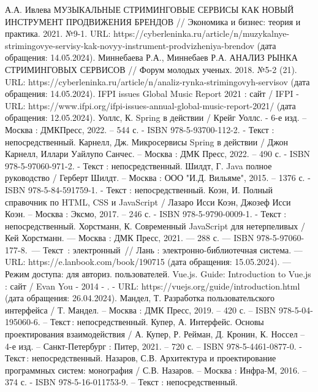 
\begin{thebibliography}{9}
     А.А. Ивлева МУЗЫКАЛЬНЫЕ СТРИМИНГОВЫЕ СЕРВИСЫ КАК НОВЫЙ ИНСТРУМЕНТ ПРОДВИЖЕНИЯ БРЕНДОВ // Экономика и бизнес: теория и практика. 2021. №9-1. URL: https://cyberleninka.ru/article/n/muzykalnye-strimingovye-servisy-kak-novyy-instrument-prodvizheniya-brendov (дата обращения: 14.05.2024).
	 Миннебаева Р.А., Миннебаев Р.А. АНАЛИЗ РЫНКА СТРИМИНГОВЫХ СЕРВИСОВ // Форум молодых ученых. 2018. №5-2 (21). URL: https://cyberleninka.ru/article/n/analiz-rynka-strimingovyh-servisov (дата обращения: 14.05.2024).
	 IFPI issues Global Music Report 2021 : сайт / IFPI - URL: https://www.ifpi.org/ifpi-issues-annual-global-music-report-2021/ (дата обращения: 12.05.2024).
      Уоллс, К. Spring в действии / Крейг Уоллс. - 6-е изд. – Москва : ДМКПресс, 2022. – 544 с. - ISBN 978-5-93700-112-2. - Текст : непосредственный.
     Карнелл, Дж. Микросервисы Spring в действии / Джон Карнелл, Иллари Уайлупо Санчес. – Москва : ДМК Пресс, 2022. – 490 с. - ISBN 978-5-97060-971-2. - Текст : непосредственный.
     Шилдт, Г. Java полное руководство / Герберт Шилдт. – Москва : ООО "И.Д. Вильяме", 2015. – 1376 с. - ISBN 978-5-84-591759-1. - Текст : непосредственный.
     Коэн, И. Полный справочник по HTML, CSS и JavaScript / Лазаро Исси Коэн, Джозеф Исси Коэн. – Москва : Эксмо, 2017. – 246 с. - ISBN 978-5-9790-0009-1. - Текст : непосредственный.
     Хорстманн, К. Современный JavaScript для нетерпеливых / Кей Хорстманн. — Москва : ДМК Пресс, 2021. — 288 с. — ISBN 978-5-97060-177-8. — Текст : электронный // Лань : электронно-библиотечная система. — URL: https://e.lanbook.com/book/190715 (дата обращения: 15.05.2024). — Режим доступа: для авториз. пользователей.
     Vue.js. Guide: Introduction to Vue.js : сайт / Evan You - 2014 - . - URL: https://vuejs.org/guide/introduction.html (дата обращения: 26.04.2024).
     Мандел, Т. Разработка пользовательского интерфейса / Т. Мандел. – Москва : ДМК Пресс, 2019. – 420 с. – ISBN 978-5-04-195060-6. – Текст : непосредственный.
     Купер, А. Интерфейс. Основы проектирования взаимодействия / А. Купер, Р. Рейман, Д. Кронин, К. Носсел – 4-е изд. – Санкт-Петербург : Питер, 2021. – 720 с. – ISBN 978-5-4461-0877-0. - Текст : непосредственный.
     Назаров, С.В. Архитектура и проектирование программных систем: монография / С.В. Назаров. – Москва : Инфра-М, 2016. – 374 с. - ISBN 978-5-16-011753-9. – Текст : непосредственный.

\end{thebibliography}
